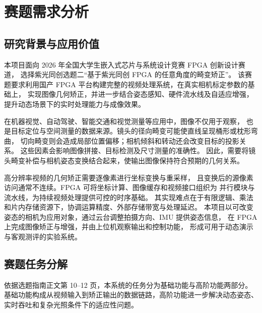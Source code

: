 \chapter{赛题需求分析}
\label{chap:introduction}

\section{研究背景与应用价值}
本项目面向 2026 年全国大学生嵌入式芯片与系统设计竞赛 FPGA 创新设计赛道，
选择紫光同创选题二“基于紫光同创 FPGA 的任意角度的畸变矫正”。
该赛题要求利用国产 FPGA 平台构建完整的视频处理系统，在真实相机标定参数的基础上，
实现图像几何矫正，并进一步结合姿态感知、硬件流水线及自适应增强，
提升动态场景下的实时处理能力与成像效果\cite{problem}。

在机器视觉、自动驾驶、智能交通和视觉测量等应用中，图像不仅用于观察，
也是目标定位与空间测量的数据来源。镜头的径向畸变可能使直线呈现桶形或枕形弯曲，
切向畸变则会造成局部位置偏移；相机倾斜和转动还会改变目标的投影关系。
这些因素会影响图像拼接、目标检测及尺寸测量的准确性。
因此，需要将镜头畸变补偿与相机姿态变换结合起来，使输出图像保持符合预期的几何关系。

高分辨率视频的几何矫正需要逐像素进行坐标变换与重采样，
且变换后的源像素访问通常不连续。FPGA 可将坐标计算、图像缓存和视频接口组织为
并行模块与流水线，为持续视频处理提供可控的时序基础。
其实现难点在于有限逻辑、乘法和片内存储资源下，协调运算精度、外部存储带宽与处理延迟。
本项目以可改变姿态的相机为应用对象，通过云台调整拍摄方向、IMU 提供姿态信息，
在 FPGA 上完成图像矫正与增强，并由上位机观察输出和控制功能，
形成可用于动态演示与客观测评的实验系统。

\section{赛题任务分解}
依据选题指南正文第 10--12 页，本系统的任务分为基础功能与高阶功能两部分。
基础功能构成从视频输入到矫正输出的数据链路，高阶功能进一步解决动态姿态、
实时吞吐和复杂光照条件下的适应性问题\cite{problem}。

